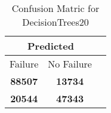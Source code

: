 \begin{table}[] 
\caption{Confusion Matric for DecisionTrees20} 
\label{Table: Prediction Accuracy-DMDDecisionTrees20OnlySunEKF-ignoreReflectionEKF-top2-Reflection} 
\centering 
\begin{tabular} 
 {@{}ccc@{}} 
\toprule 
\multicolumn{2}{c}{\textbf{Predicted}}
 \\ \midrule 
\multicolumn{1}{|c|}{Failure} & 
\multicolumn{1}{c|}{No Failure}
 \\ \midrule 
\multicolumn{1}{|c|}{\color{green}\textbf{88507}} & 
\multicolumn{1}{c|}{\color{red}\textbf{13734}}
 \\ \midrule 
\multicolumn{1}{|c|}{\color{red}\textbf{20544}} & 
\multicolumn{1}{c|}{\color{green}\textbf{47343}}
 \\ \bottomrule 
\end{tabular} 
\end{table} 
